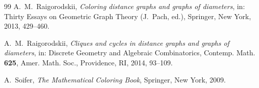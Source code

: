 \documentclass[10pt]{article}
\theoremstyle{plain}
\theoremstyle{remark}
\begin{document}
\begin{thebibliography}{99}
 A.~M.~Raigorodskii,
\emph{Coloring distance graphs and graphs of diameters}, in: Thirty Essays
on Geometric Graph Theory (J.~Pach, ed.), Springer, New York, 2013, 429--460.

 A.~M.~Raigorodskii,
\emph{Cliques and cycles in distance graphs and graphs of diameters}, in:
Discrete Geometry and Algebraic Combinatorics, Contemp. Math. \textbf{625},
Amer. Math. Soc., Providence, RI, 2014, 93--109.

 A.~Soifer,
\emph{The Mathematical Coloring Book}, Springer, New York, 2009.

\end{thebibliography}
\end{document}
